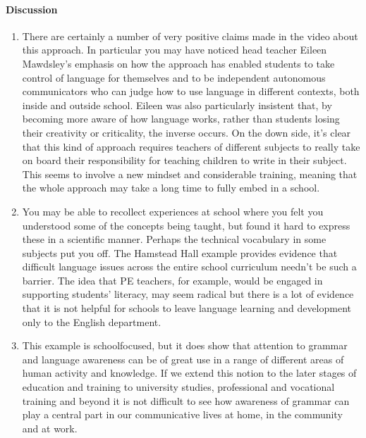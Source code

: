 \documentclass[letterpaper,10pt,english]{sphinxmanual}
\let\sphinxpxdimen\pdfpxdimen\else\newdimen\sphinxpxdimen
\begin{document}
\sphinxincludegraphics[width=512\sphinxpxdimen,height=288\sphinxpxdimen]{{e304_2015j_vid014-still}.jpg}


\paragraph{Discussion}
\label{\detokenize{content/session_00/Part_00_07:id2}}\begin{enumerate}
%
\item {} 
There are certainly a number of very positive claims made in the video about this approach. In particular you may have noticed head teacher Eileen Mawdsley’s emphasis on how the approach has enabled students to take control of language for themselves and to be independent autonomous communicators who can judge how to use language in different contexts, both inside and outside school. Eileen was also particularly insistent that, by becoming more aware of how language works, rather than
students losing their creativity or criticality, the inverse occurs. On the down side, it’s clear that this kind of approach requires teachers of different subjects to really take on board their responsibility for teaching children to write in their subject. This seems to involve a new mindset and considerable training, meaning that the whole approach may take a long time to fully embed in a school.

\item {} 
You may be able to recollect experiences at school where you felt you understood some of the concepts being taught, but found it hard to express these in a scientific manner. Perhaps the technical vocabulary in some subjects put you off. The Hamstead Hall example provides evidence that difficult language issues across the entire school curriculum needn’t be such a barrier. The idea that PE teachers, for example, would be engaged in supporting students’ literacy, may seem radical but there is
a lot of evidence that it is not helpful for schools to leave language learning and development only to the English department.

\item {} 
This example is school\sphinxhyphen{}focused, but it does show that attention to grammar and language awareness can be of great use in a range of different areas of human activity and knowledge. If we extend this notion to the later stages of education and training \textendash{} to university studies, professional and vocational training and beyond \textendash{} it is not difficult to see how awareness of grammar can play a central part in our communicative lives at home, in the community and at work.

\end{enumerate}
\end{document}
